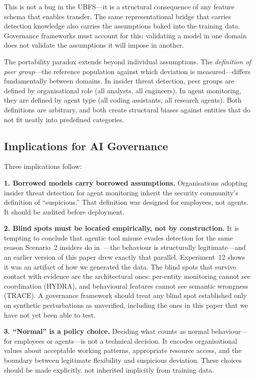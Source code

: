 \documentclass[conference]{IEEEtran}
\begin{document}
This is not a bug in the UBFS---it is a structural consequence of any feature schema that enables transfer. The same representational bridge that carries detection knowledge also carries the assumptions baked into the training data. Governance frameworks must account for this: validating a model in one domain does not validate the assumptions it will impose in another.

The portability paradox extends beyond individual assumptions. The \textit{definition of peer group}---the reference population against which deviation is measured---differs fundamentally between domains. In insider threat detection, peer groups are defined by organisational role (all analysts, all engineers). In agent monitoring, they are defined by agent type (all coding assistants, all research agents). Both definitions are arbitrary, and both create structural biases against entities that do not fit neatly into predefined categories.

\subsection{Implications for AI Governance}

Three implications follow:

\textbf{1. Borrowed models carry borrowed assumptions.} Organisations adopting insider threat detection for agent monitoring inherit the security community's definition of ``suspicious.'' That definition was designed for employees, not agents. It should be audited before deployment.

\textbf{2. Blind spots must be located empirically, not by construction.} It is tempting to conclude that agentic tool misuse evades detection for the same reason Scenario~2 insiders do in~\cite{rimal2026insider}---the behaviour is structurally legitimate---and an earlier version of this paper drew exactly that parallel. Experiment~12 shows it was an artifact of how we generated the data. The blind spots that survive contact with evidence are the architectural ones: per-entity monitoring cannot see coordination (HYDRA), and behavioural features cannot see semantic wrongness (TRACE). A governance framework should treat any blind spot established only on synthetic perturbations as unverified, including the ones in this paper that we have not yet been able to test.

\textbf{3. ``Normal'' is a policy choice.} Deciding what counts as normal behaviour---for employees or agents---is not a technical decision. It encodes organisational values about acceptable working patterns, appropriate resource access, and the boundary between legitimate flexibility and suspicious deviation. These choices should be made explicitly, not inherited implicitly from training data.
\end{document}
